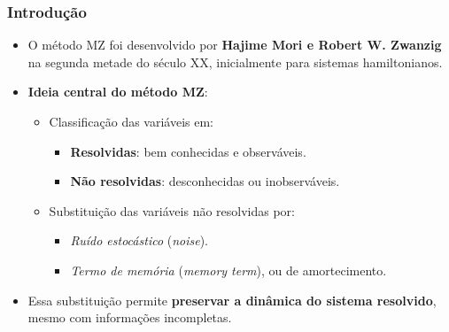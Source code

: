 \begin{frame}\frametitle{Introdução}
\begin{itemize}
    \item O método MZ foi desenvolvido por \textbf{Hajime Mori e Robert W. Zwanzig} na segunda metade do século XX, inicialmente para sistemas hamiltonianos.
    
    \item \textbf{Ideia central do método MZ}:
    \begin{itemize}
        \item Classificação das variáveis em:
        \begin{itemize}
            \item \textbf{Resolvidas}: bem conhecidas e observáveis.
            \item \textbf{Não resolvidas}: desconhecidas ou inobserváveis.
        \end{itemize}
        \item Substituição das variáveis não resolvidas por:
        \begin{itemize}
            \item \textit{Ruído estocástico} (\textit{noise}).
            \item \textit{Termo de memória} (\textit{memory term}), ou de amortecimento.
        \end{itemize}
    \end{itemize}
    
    \item Essa substituição permite \textbf{preservar a dinâmica do sistema resolvido}, mesmo com informações incompletas.
\end{itemize}
\end{frame}


